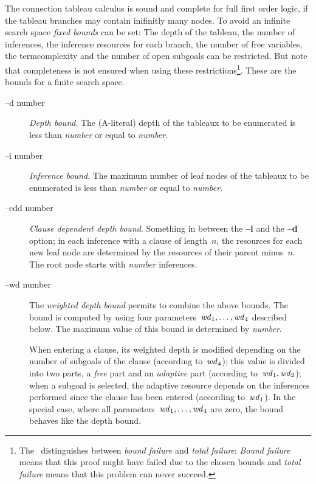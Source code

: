 The connection tableau calculus is sound and complete for full
first order logic, if the tableau branches may contain inifinitly
many nodes. To avoid an infinite search space {\it fixed
bounds\/} can be set: The depth of the tableau, the number of
inferences, the inference resources for each branch, the number
of free variables, the termcomplexity and the number of open
subgoals can be restricted. But note that completeness is not ensured
when using these restrictions\footnote{The \SAM\ distinguishes between
{\it bound failure\/} and {\it total failure\/}: {\it Bound failure\/}
means that this proof might have failed due to the chosen bounds and
{\it total failure\/} means that this problem can never
succeed.}. These are the bounds for a finite search space.  
\begin{description}
      \item[--d number]
           {\em Depth bound\/}. The (A-literal) depth of the
           tableaux to be  enumerated is less than {\it number\/} or
           equal to {\it number\/}. 
      \item[--i number]
           {\em Inference bound\/}. The maximum number of leaf nodes
           of the tableaux to  be enumerated  is  less  
           than {\it number\/} or equal to {\it number\/}.
      \item[--cdd number]
           {\em Clause dependent depth bound\/}. Something in between the
           {\bf --i} and the {\bf --d} option; in each inference with
           a clause of length~$n$, the resources for each new leaf
           node are determined by the resources of their parent
           minus~$n$. The root node starts with {\it number\/}
           inferences. 
      \item[--wd number]
           The {\em weighted depth bound\/} permits to combine the
           above bounds. The bound is computed by using four
           parameters~$\mbox{{\it wd\/}}_1, \dots, \mbox{{\it wd\/}}_4$
           described below. The maximum value of  this bound  is
           determined by {\it number\/}. 

           When entering a clause, its weighted depth is modified
           depending on the number of  subgoals  of  the  clause
           (according to~$\mbox{{\it wd\/}}_4$); this value is divided 
           into two parts, a {\em free\/} part and an {\em adaptive}
           part (according to~$\mbox{{\it wd\/}}_1, \mbox{{\it
           wd\/}}_2$); when a subgoal is selected, the adaptive
           resource depends on the inferences  performed since the
           clause has been entered (according to~$\mbox{{\it
           wd\/}}_1$). In the special case, where all
           parameters~$\mbox{{\it wd\/}}_1, \dots, \mbox{{\it
           wd\/}}_4$ are zero, the bound behaves like the depth bound.  


\end{description}
